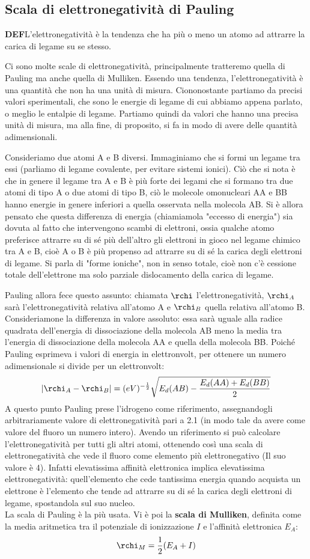 \subsection{Scala di elettronegatività di Pauling}
\textbf{DEF}L'elettronegatività è la tendenza che ha più o meno un atomo ad attrarre la carica di legame su se stesso.

Ci sono molte scale di elettronegatività, principalmente tratteremo quella di Pauling ma anche quella di Mulliken.
Essendo una tendenza, l'elettronegatività è una quantità che non ha una unità di misura. Ciononostante partiamo da precisi valori sperimentali, che sono le energie di legame di cui abbiamo appena parlato, o meglio le entalpie di legame. Partiamo quindi da valori che hanno una precisa unità di misura, ma alla fine, di proposito, si fa in modo di avere delle quantità adimensionali.

Consideriamo due atomi A e B diversi. Immaginiamo che si formi un legame tra essi (parliamo di legame covalente, per evitare sistemi ionici). Ciò che si nota è che in genere il legame tra A e B è più forte dei legami che si formano tra due atomi di tipo A o due atomi di tipo B, ciò le molecole omonucleari AA e BB hanno energie in genere inferiori a quella osservata nella molecola AB. Si è allora pensato che questa differenza di energia (chiamiamola "eccesso di energia") sia dovuta al fatto che intervengono scambi di elettroni, ossia qualche atomo preferisce attrarre su di sé più dell'altro gli elettroni in gioco nel legame chimico tra A e B, cioè A o B è più propenso ad attrarre su di sé la carica degli elettroni di legame. Si parla di "forme ioniche", non in senso totale, cioè non c'è cessione totale dell'elettrone ma solo parziale dislocamento della carica di legame.

Pauling allora fece questo assunto: chiamata $\rchi$ l'elettronegatività, $\rchi_A$ sarà l'elettronegatività relativa all'atomo A e $\rchi_B$ quella relativa all'atomo B. Consideriamone la differenza in valore assoluto: essa sarà uguale alla radice quadrata dell'energia di dissociazione della molecola AB meno la media tra l'energia di dissociazione della molecola AA e quella della molecola BB. Poiché Pauling esprimeva i valori di energia in elettronvolt, per ottenere un numero adimensionale si divide per un elettronvolt:
$$|\rchi_A - \rchi_B| = (eV)^{-\frac{1}{2}}\sqrt{E_d(AB)-\frac{E_d(AA) + E_d(BB)}{2}}$$
A questo punto Pauling prese l'idrogeno come riferimento, assegnandogli arbitrariamente valore di elettronegatività pari a 2.1 (in modo tale da avere come valore del fluoro un numero intero). Avendo un riferimento si può calcolare l'elettronegatività per tutti gli altri atomi, ottenendo così una scala di elettronegatività che vede il fluoro come elemento più elettronegativo (Il suo valore è 4). Infatti elevatissima affinità elettronica implica elevatissima elettronegatività: quell'elemento che cede tantissima energia quando acquista un elettrone è l'elemento che tende ad attrarre su di sé la carica degli elettroni di legame, spostandola sul suo nucleo.\\

La scala di Pauling è la più usata. Vi è poi la \textbf{scala di Mulliken}, definita come la media aritmetica tra il potenziale di ionizzazione $I$ e l'affinità elettronica $E_A$:
$$\rchi_M=\frac{1}{2}(E_A + I)$$